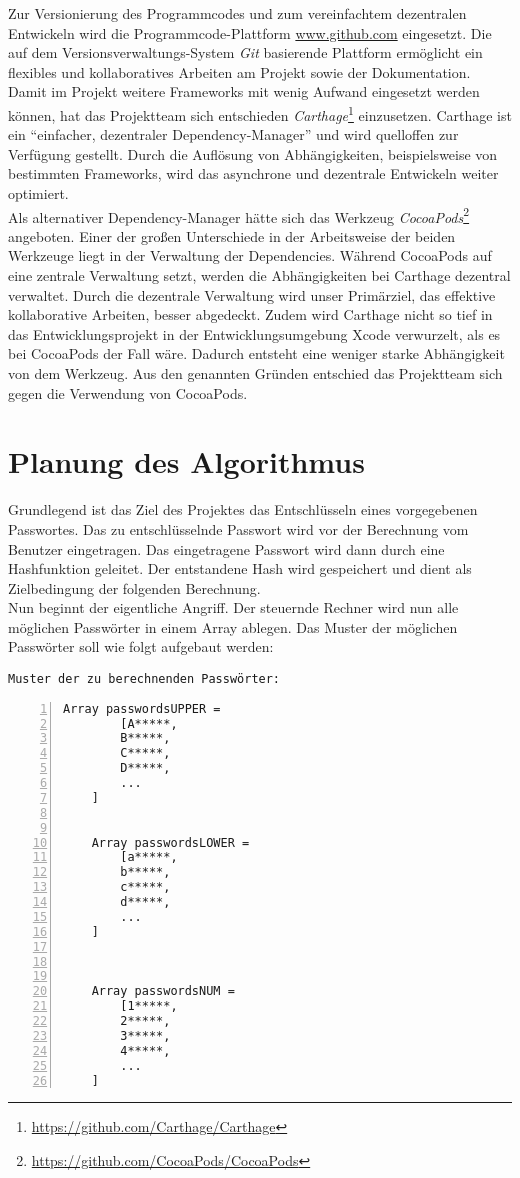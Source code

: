 Zur Versionierung des Programmcodes und zum vereinfachtem dezentralen Entwickeln wird die Programmcode-Plattform \url{www.github.com} eingesetzt. Die auf dem Versionsverwaltungs-System \emph{Git} basierende Plattform ermöglicht ein flexibles und kollaboratives Arbeiten am Projekt sowie der Dokumentation. \\

Damit im Projekt weitere Frameworks mit wenig Aufwand eingesetzt werden können, hat das Projektteam sich entschieden \emph{Carthage}\footnote{\url{https://github.com/Carthage/Carthage}} einzusetzen. Carthage ist ein \enquote{einfacher, dezentraler Dependency-Manager} und wird quelloffen zur Verfügung gestellt. Durch die Auflösung von Abhängigkeiten, beispielsweise von bestimmten Frameworks, wird das asynchrone und dezentrale Entwickeln weiter optimiert. \\
Als alternativer Dependency-Manager hätte sich das Werkzeug \emph{CocoaPods}\footnote{\url{https://github.com/CocoaPods/CocoaPods}} angeboten. Einer der großen Unterschiede in der Arbeitsweise der beiden Werkzeuge liegt in der Verwaltung der Dependencies. Während CocoaPods auf eine zentrale Verwaltung setzt, werden die Abhängigkeiten bei Carthage dezentral verwaltet. Durch die dezentrale Verwaltung wird unser Primärziel, das effektive kollaborative Arbeiten, besser abgedeckt. Zudem wird Carthage nicht so tief in das Entwicklungsprojekt in der Entwicklungsumgebung Xcode verwurzelt, als es bei CocoaPods der Fall wäre. Dadurch entsteht eine weniger starke Abhängigkeit von dem Werkzeug. Aus den genannten Gründen entschied das Projektteam sich gegen die Verwendung von CocoaPods. 



\section{Planung des Algorithmus}
\label{ideeBruteForce}
Grundlegend ist das Ziel des Projektes das Entschlüsseln eines vorgegebenen Passwortes. Das zu entschlüsselnde Passwort wird vor der Berechnung vom Benutzer eingetragen. Das eingetragene Passwort wird dann durch eine Hashfunktion geleitet. Der entstandene Hash wird gespeichert und dient als Zielbedingung der folgenden Berechnung. \\
Nun beginnt der eigentliche Angriff. Der steuernde Rechner wird nun alle möglichen Passwörter in einem Array ablegen. Das Muster der möglichen Passwörter soll wie folgt aufgebaut werden: 
\newpage

\texttt{Muster der zu berechnenden Passwörter:}
\begin{lstlisting}[basicstyle=\ttfamily,numbers=left,numberstyle=\footnotesize\ttfamily,backgroundcolor=\color{sourcegray}]
	Array passwordsUPPER = 
		[A*****,
	 	B*****,
	 	C*****,
	 	D*****,
	 	...
	]
	
	
	Array passwordsLOWER = 
		[a*****,
	 	b*****,
	 	c*****,
	 	d*****,
		...
	]
	
	

	Array passwordsNUM = 
		[1*****,
	 	2*****,
	 	3*****,
	 	4*****,
		...
	]
\end{lstlisting}
\newpage

